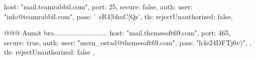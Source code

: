 host: "mail.teamrabbil.com",
port: 25,
secure: false,
auth: {user: "info@teamrabbil.com", pass: '~sR4[bhaC[Qs'},
tls: {rejectUnauthorized: false},


@@@ Aumit bro............................
host: "mail.themesoft69.com",
port: 465,
secure: true,
auth: {
  user: "mern_ostad@themesoft69.com",
  pass: "h4e24DFTj6v)",
},
tls: { rejectUnauthorized: false },
